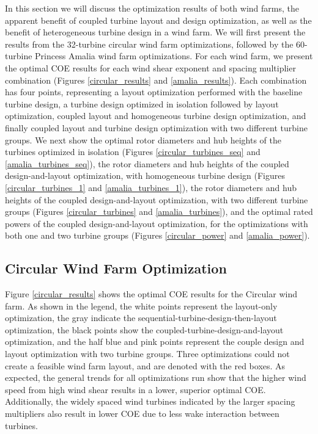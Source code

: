 \newcommand\myeq{\mkern1.5mu{=}\mkern1.5mu}


In this section we will discuss the optimization results of both wind farms, the apparent benefit of coupled turbine layout and design optimization, as well as the benefit of heterogeneous turbine design in a wind farm.
We will first present the results from the 32-turbine circular wind farm optimizations, followed by the 60-turbine Princess Amalia wind farm optimizations. For each wind farm, we present the optimal COE results for each wind shear exponent and spacing multiplier combination (Figures \ref{circular_results} and \ref{amalia_results}). Each combination has four points, representing a layout optimization performed with the baseline turbine design, a turbine design optimized in isolation followed by layout optimization, coupled layout and homogeneous turbine design optimization, and finally coupled layout and turbine design optimization with two different turbine groups. 
We next show the optimal rotor diameters and hub heights of the turbines optimized in isolation (Figures \ref{circular_turbines_seq} and \ref{amalia_turbines_seq}), the rotor diameters and hub heights of the coupled design-and-layout optimization, with homogeneous turbine design (Figures \ref{circular_turbines_1} and \ref{amalia_turbines_1}), the rotor diameters and hub heights of the coupled design-and-layout optimization, with two different turbine groups (Figures \ref{circular_turbines} and \ref{amalia_turbines}), and the optimal rated powers of the coupled design-and-layout optimization, for the optimizations with both one and two turbine groups (Figures \ref{circular_power} and \ref{amalia_power}).



\subsection{Circular Wind Farm Optimization}

Figure \ref{circular_results} shows the optimal COE results for the Circular wind farm. As shown in the legend, the white points represent the layout-only optimization, the gray indicate the sequential-turbine-design-then-layout optimization, the black points show the coupled-turbine-design-and-layout optimization, and the half blue and pink points represent the couple design and layout optimization with two turbine groups. Three optimizations could not create a feasible wind farm layout, and are denoted with the red boxes. As expected, the general trends for all optimizations run show that the higher wind speed from high wind shear results in a lower, superior optimal COE. Additionally, the widely spaced wind turbines indicated by the larger spacing multipliers also result in lower COE due to less wake interaction between turbines. 

